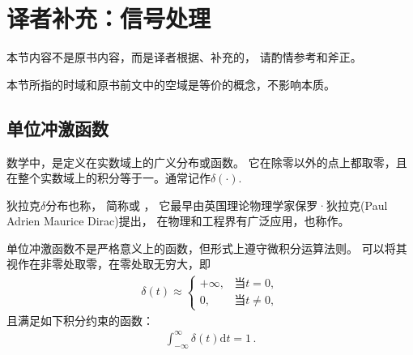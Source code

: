 \section{译者补充：信号处理}\label{sec:译者补充：信号处理}
\begin{remark}
    本节内容不是原书内容，而是译者根据\citet{enwiki:1115652231,enwiki:1115414995,
        enwiki:1098200554,enwiki:1114206769}、\citet{DigitalSignalProcessing}补充的，
    请酌情参考和斧正。
\end{remark}
\begin{notation}
    本节所指的时域和原书前文中的空域是等价的概念，不影响本质。
\end{notation}
\subsection{单位冲激函数}\label{sub:单位冲激函数}
\begin{definition}
    数学中，是定义在实数域上的广义分布或函数。
    它在除零以外的点上都取零，且在整个实数域上的积分等于一。通常记作$\delta(\cdot)$.
\end{definition}

狄拉克$\delta$分布也称，
简称或
，
它最早由英国理论物理学家保罗·狄拉克(Paul Adrien Maurice Dirac)提出，
在物理和工程界有广泛应用，也称作。

单位冲激函数不是严格意义上的函数，但形式上遵守微积分运算法则。
可以将其视作在非零处取零，在零处取无穷大，即
\begin{align}
    \delta(t)\approx\left\{
    \begin{array}{ll}
        +\infty, & \text{当}t=0,     \\
        0,       & \text{当}t\neq 0,
    \end{array}
    \right.
\end{align}
且满足如下积分约束的函数：
\begin{align}
    \int_{-\infty}^{\infty}\delta(t)\mathrm{d}t=1\, .
\end{align}

